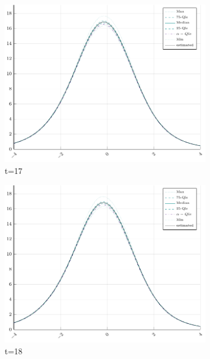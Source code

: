 \begin{figure}[H]
\begin{subfigure}[t]{0.31\textwidth}
		\includegraphics[width=\linewidth]{Figures/real/17_infoplot.pdf}
		\caption{t=17} 
	\end{subfigure}
	\begin{subfigure}[t]{0.31\textwidth}
		\centering
		\includegraphics[width=\linewidth]{Figures/real/18_infoplot.pdf}
		\caption{t=18} 
	\end{subfigure}\\
	\begin{subfigure}[t]{0.31\textwidth}
		\centering

\end{subfigure}
\end{figure}
